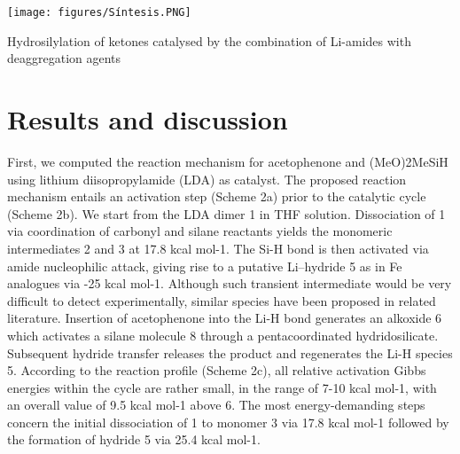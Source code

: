 \documentclass[journal=jacsat,manuscript=article]{achemso}
\begin{document}
	\begin{scheme}[h]
		\texttt{[image: figures/Síntesis.PNG]}
		\centering
		\caption{Hydrosilylation of ketones catalysed by the combination of	Li-amides with deaggregation agents}
		\centering
		\label{Scheme1}
	\end{scheme}	
	
	
	\section{Results and discussion}
	First, we computed the reaction mechanism for acetophenone and (MeO)2MeSiH using lithium diisopropylamide (LDA) as catalyst. The proposed reaction mechanism entails an activation step (Scheme 2a) prior to the catalytic cycle (Scheme 2b). We start from the LDA dimer 1 in THF solution. Dissociation of 1 via coordination of carbonyl and silane reactants yields the monomeric intermediates 2 and 3 at 17.8 kcal mol-1. The Si-H bond is then activated via amide nucleophilic attack, giving rise to a putative Li–hydride 5 as in Fe analogues  via -25 kcal mol-1. Although such transient intermediate would be very difficult to detect experimentally, similar species have been proposed in related literature. Insertion of acetophenone into the Li-H bond generates an alkoxide 6 which activates a silane molecule 8 through a pentacoordinated hydridosilicate. Subsequent	hydride transfer releases the product and regenerates the Li-H species 5. According to the reaction profile (Scheme 2c), all relative activation Gibbs energies within the cycle are rather small, in the range of 7-10 kcal mol-1, with an overall value of 9.5 kcal mol-1 above 6. The most energy-demanding steps concern the initial dissociation of 1 to monomer 3 via 17.8 kcal mol-1 followed by the formation of hydride 5 via 25.4 kcal mol-1.
	
\end{document}
